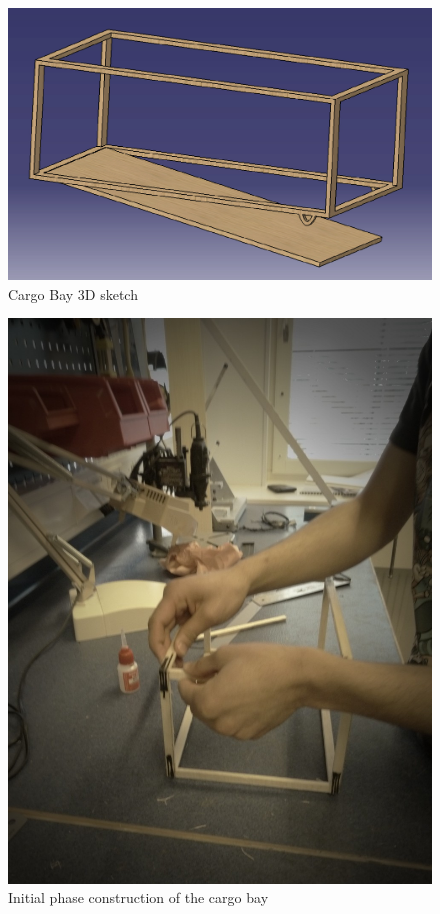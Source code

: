 \begin{figure}[bht]
\centering
\includegraphics[scale=0.5]{figures/box.png}
\caption{Cargo Bay 3D sketch}
\label{fig:box}
\end{figure}

\begin{figure}[bht]
\centering
\includegraphics[scale=0.5]{figures/boxinit.jpg}
\caption{Initial phase construction of the cargo bay}
\label{fig:boxinit}
\end{figure}

